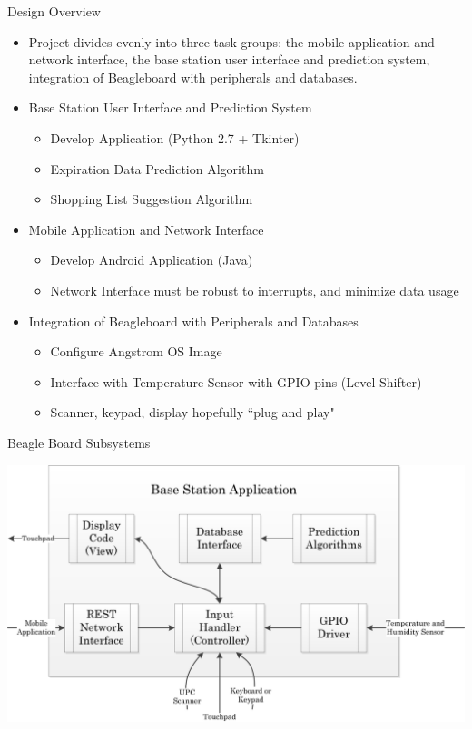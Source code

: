 \documentclass[t]{beamer}
\begin{document}
\begin{frame}{Design Overview}
\begin{itemize}
\item Project divides evenly into three task groups: the mobile application and network interface, the base station user interface and prediction system, integration of Beagleboard with peripherals and databases.
\item Base Station User Interface and Prediction System
\begin{itemize}
\item Develop Application (Python 2.7 + Tkinter)
\item Expiration Data Prediction Algorithm
\item Shopping List Suggestion Algorithm
\end{itemize}
\item Mobile Application and Network Interface
\begin{itemize}
\item Develop Android Application (Java)
\item Network Interface must be robust to interrupts, and minimize data usage
\end{itemize}
\item Integration of Beagleboard with Peripherals and Databases
\begin{itemize}
\item Configure Angstrom OS Image
\item Interface with Temperature Sensor with GPIO pins (Level Shifter)
\item Scanner, keypad, display hopefully ``plug and play"
\end{itemize}
\end{itemize}
\end{frame}

\begin{frame}{Beagle Board Subsystems}
\begin{center}
\includegraphics[scale=0.65]{../Graphics/BaseStation}
\end{center}
\end{frame}
\end{document}
